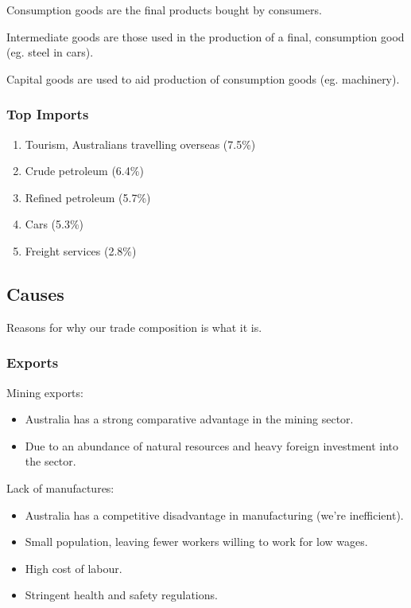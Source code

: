 \documentclass[a4paper,11pt]{article}
\begin{document}
Consumption goods are the final products bought by consumers.

Intermediate goods are those used in the production of a final, consumption
good (eg. steel in cars).

Capital goods are used to aid production of consumption goods (eg. machinery).


\subsubsection{Top Imports}

\begin{enumerate}
\item Tourism, Australians travelling overseas (7.5\%)
\item Crude petroleum (6.4\%)
\item Refined petroleum (5.7\%)
\item Cars (5.3\%)
\item Freight services (2.8\%)
\end{enumerate}


\subsection{Causes}

Reasons for why our trade composition is what it is.

\subsubsection{Exports}

Mining exports:

\begin{itemize}
\item Australia has a strong comparative advantage in the mining sector.
\item Due to an abundance of natural resources and heavy foreign investment
	into the sector.
\end{itemize}

Lack of manufactures:

\begin{itemize}
\item Australia has a competitive disadvantage in manufacturing (we're
	inefficient).
\item Small population, leaving fewer workers willing to work for low wages.
\item High cost of labour.
\item Stringent health and safety regulations.
\end{itemize}
\end{document}
